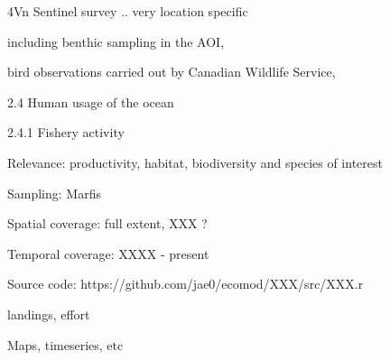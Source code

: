 \documentclass[letterpaper,portrait,12pt]{scrartcl}
\numberwithin{equation}{section}		%
\numberwithin{figure}{section}			%
\numberwithin{table}{section}				%
\begin{document}
\begin{flushleft}

	4Vn Sentinel survey .. very location specific

\end{flushleft}


\begin{flushleft}

	including benthic sampling in the AOI, 

\end{flushleft}


\begin{flushleft}

	bird observations carried out by Canadian Wildlife Service, 

\end{flushleft}













2.4  Human usage of the ocean









2.4.1 Fishery activity









Relevance:  productivity, habitat, biodiversity and species of interest




Sampling:  Marfis




Spatial coverage: full extent, XXX ?




Temporal coverage: XXXX - present




Source code: https://github.com/jae0/ecomod/XXX/src/XXX.r














landings, effort




Maps, timeseries, etc
\end{document}
